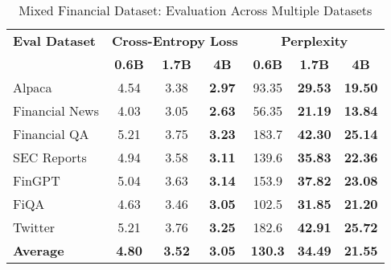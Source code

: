 
\begin{table}[h]
\centering
\caption[Mixed Financial: Evaluation Results]{Mixed Financial Dataset: Evaluation Across Multiple Datasets}
\label{tab:mixed_financial_results}
\begin{tabular}{l|ccc|ccc}
\hline
\textbf{Eval Dataset} & \multicolumn{3}{c|}{\textbf{Cross-Entropy Loss}} & \multicolumn{3}{c}{\textbf{Perplexity}} \\
\cline{2-4} \cline{5-7}
  & \textbf{0.6B} & \textbf{1.7B} & \textbf{4B} & \textbf{0.6B} & \textbf{1.7B} & \textbf{4B} \\
\hline
Alpaca & 4.54 & 3.38 & \textbf{2.97} & 93.35 & \textbf{29.53} & \textbf{19.50} \\
Financial News & 4.03 & 3.05 & \textbf{2.63} & 56.35 & \textbf{21.19} & \textbf{13.84} \\
Financial QA & 5.21 & 3.75 & \textbf{3.23} & 183.7 & \textbf{42.30} & \textbf{25.14} \\
SEC Reports & 4.94 & 3.58 & \textbf{3.11} & 139.6 & \textbf{35.83} & \textbf{22.36} \\
FinGPT & 5.04 & 3.63 & \textbf{3.14} & 153.9 & \textbf{37.82} & \textbf{23.08} \\
FiQA & 4.63 & 3.46 & \textbf{3.05} & 102.5 & \textbf{31.85} & \textbf{21.20} \\
Twitter & 5.21 & 3.76 & \textbf{3.25} & 182.6 & \textbf{42.91} & \textbf{25.72} \\
\hline
\textbf{Average} & \textbf{4.80} & \textbf{3.52} & \textbf{3.05} & \textbf{130.3} & \textbf{34.49} & \textbf{21.55} \\
\hline
\end{tabular}
\end{table}
